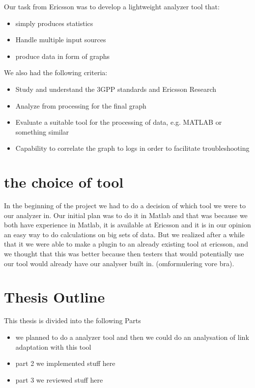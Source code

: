 \documentclass[cropmarks, frame, english]{idamasterthesis}
\begin{document}
Our task from Ericsson was to develop a lightweight analyzer tool that:

 \begin{itemize} 
 \item simply produces statistics
 \item Handle multiple input sources
 \item produce data in form of graphs
 \end{itemize} 

\setlength{\parindent}{0cm} We also had the following criteria: 
 
 \begin{itemize} 
 \item Study and understand the 3GPP standards and Ericsson Research
 \item Analyze from processing for the final graph
 \item Evaluate a suitable tool for the processing of data, e.g. MATLAB or something similar
 \item Capability to correlate the graph to logs in order to facilitate troubleshooting
 \end{itemize}



\section{the choice of tool}
In the beginning of the project we had to do a decision of which tool we were to our analyzer in. Our initial plan was to do it in Matlab and that was because we both have experience in Matlab, it is available at Ericsson and it is in our opinion an easy way to do calculations on big sets of data. But we realized after a while that it we were able to make a plugin to an already existing tool at ericsson, and we thought that this was better because then testers that would potentially use our tool would already have our analyser built in. (omformulering vore bra).

\section{Thesis Outline}
This thesis is divided into the following Parts
\begin{itemize}
	\item we planned to do a analyzer tool and then we could do an analysation of link adaptation with this tool
	\item part 2 we implemented stuff here
	\item part 3 we reviewed stuff here
\end{itemize}
\end{document}

